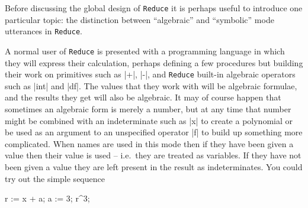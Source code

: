 \documentclass[12pt,twoside,openright]{memoir}
\newcommand{\reduce}{\texttt{Reduce}\xspace}
\begin{document}
Before discussing the global design of \reduce it is perhaps useful to
introduce one particular topic: the distinction between ``algebraic'' and
``symbolic'' mode utterances in \reduce.

A normal user of \reduce is presented with a programming language in which
they will express their calculation, perhaps defining a few procedures
but building their work on primitives such as |+|, |-|, and \reduce
built-in algebraic operators such as |int| and |df|. The values that
they work with will be algebraic formulae, and the results they get will
also be algebraic. It may of course happen that sometimes an algebraic
form is merely a number, but at any time that number might be combined with
an indeterminate such as |x| to create a polynomial or be used as
an argument to an unspecified operator |f| to build up something more
complicated. When names are used in this mode then if they have been given a
value then their value is used -- i.e.\ they are treated as variables. If they
have not been given a value they are left present in the result as
indeterminates. You could try out the simple sequence
\begin{rlispverb}
  r := x + a;   %
  a := 3;       %
  r^3;          %
\end{rlispverb}
\end{document}
